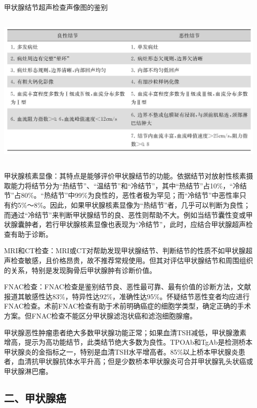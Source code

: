 \begin{table}[htbp]
\centering
\caption{甲状腺结节超声检查声像图的鉴别}
\label{tab38-6}
\includegraphics[width=5.95833in,height=3.01042in]{./images/Image00243.jpg}
\end{table}

甲状腺核素显像：其特点是能够评价甲状腺结节的功能。依据结节对放射性核素摄取能力将结节分为“热结节”、“温结节”和“冷结节”，其中“热结节”占10\%，“冷结节”占80\%。“热结节”中99\%为良性的，恶性者极为罕见；而“冷结节”中恶性率只有约5\%～8\%。因此，如果甲状腺核素显像为“热结节”者，几乎可以判断为良性；而通过“冷结节”来判断甲状腺结节的良、恶性则帮助不大。例如当结节囊性变或甲状腺囊肿者，若行甲状腺核素显像也表现为“冷结节”，此时，应结合甲状腺超声检查有助于诊断。

MRI和CT检查：MRI或CT对帮助发现甲状腺结节、判断结节的性质不如甲状腺超声检查敏感，且价格昂贵，故不推荐常规使用。但其对评估甲状腺结节和周围组织的关系，特别是发现胸骨后甲状腺肿有诊断价值。

FNAC检查：FNAC检查是鉴别结节良、恶性最可靠、最有价值的诊断方法，文献报道其敏感性达83\%，特异性达92\%，准确性达95\%。怀疑结节恶性变者均应进行FNAC检查。术前FNAC检查有助于术前明确癌症的细胞学类型，确定正确的手术方案。但FNAC检查不能区分甲状腺滤泡状癌和滤泡细胞腺瘤。

甲状腺恶性肿瘤患者绝大多数甲状腺功能正常；如果血清TSH减低，甲状腺激素增高，提示为高功能结节，此类结节绝大多数为良性。TPOAb和TgAb是检测桥本甲状腺炎的金指标之一，特别是血清TSH水平增高者。85\%以上桥本甲状腺炎患者，血清抗甲状腺抗体水平升高；但是少数桥本甲状腺炎可合并甲状腺乳头状癌或甲状腺淋巴瘤。

\subsection{二、甲状腺癌}

